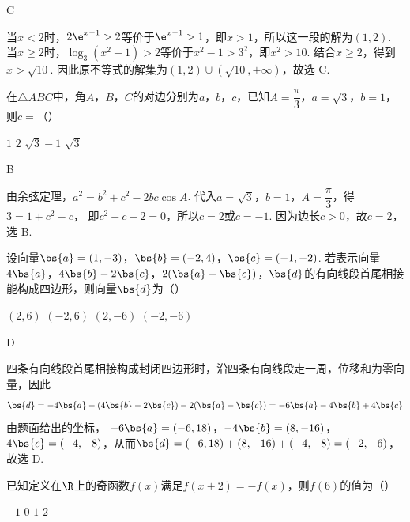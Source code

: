 \begin{answer}
C
\end{answer}

\begin{solution}
当\(x<2\)时，\(2\e^{x-1}>2\)等价于\(\e^{x-1}>1\)，即\(x>1\)，所以这一段的解为\((1,2)\). 当\(x\geqslant2\)时，\(\log_3(x^2-1)>2\)等价于\(x^2-1>3^2\)，即\(x^2>10\). 结合\(x\geqslant2\)，得到\(x>\sqrt{10}\). 因此原不等式的解集为\((1,2)\cup(\sqrt{10},+\infty)\)，故选 C.
\end{solution}

\begin{problem}
在\(\triangle ABC\)中，角\(A\)，\(B\)，\(C\)的对边分别为\(a\)，\(b\)，\(c\)，已知\(A=\dfrac{\pi}{3}\)，\(a=\sqrt{3}\)，\(b=1\)，则\(c=\)（\quad）

\choices
    {\(1\)}
    {\(2\)}
    {\(\sqrt{3}-1\)}
    {\(\sqrt{3}\)}
\end{problem}

\begin{answer}
B
\end{answer}

\begin{solution}
由余弦定理，\(a^2=b^2+c^2-2bc\cos A\). 代入\(a=\sqrt{3}\)，\(b=1\)，\(A=\dfrac{\pi}{3}\)，得\(3=1+c^2-c\)，
即\(c^2-c-2=0\)，所以\(c=2\)或\(c=-1\). 因为边长\(c>0\)，故\(c=2\)，选 B.
\end{solution}

\begin{problem}
设向量\(\bs{a}=(1,-3)\)，\(\bs{b}=(-2,4)\)，\(\bs{c}=(-1,-2)\). 若表示向量\(4\bs{a}\)，\(4\bs{b}-2\bs{c}\)，\(2(\bs{a}-\bs{c})\)，\(\bs{d}\)的有向线段首尾相接能构成四边形，则向量\(\bs{d}\)为（\quad）

\choices
    {\((2,6)\)}
    {\((-2,6)\)}
    {\((2,-6)\)}
    {\((-2,-6)\)}
\end{problem}

\begin{answer}
D
\end{answer}

\begin{solution}
四条有向线段首尾相接构成封闭四边形时，沿四条有向线段走一周，位移和为零向量，因此
\[
\bs{d}=-4\bs{a}-(4\bs{b}-2\bs{c})-2(\bs{a}-\bs{c})
      =-6\bs{a}-4\bs{b}+4\bs{c}
\]
由题面给出的坐标，
\(-6\bs{a}=(-6,18)\)，\(-4\bs{b}=(8,-16)\)，\(4\bs{c}=(-4,-8)\)，从而\(\bs{d}=(-6,18)+(8,-16)+(-4,-8)=(-2,-6)\)，故选 D.
\end{solution}

\begin{problem}
已知定义在\(\R\)上的奇函数\(f(x)\)满足\(f(x+2)=-f(x)\)，则\(f(6)\)的值为（\quad）

\choices
    {\(-1\)}
    {\(0\)}
    {\(1\)}
    {\(2\)}
\end{problem}

